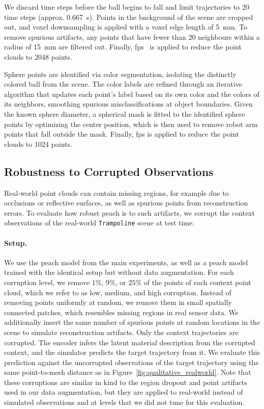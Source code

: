 We discard time steps before the ball begins to fall and limit trajectories to 20 time steps (approx. \SI{0.667}{\s}).
Points in the background of the scene are cropped out, and voxel downsampling is applied with a voxel edge length of \SI{5}{\mm}.
To remove spurious artifacts, any points that have fewer than $20$ neighbours within a radius of \SI{15}{\mm} are filtered out.
Finally, \gls{fps}~\citep{ruizhongtai2017pointnet} is applied to reduce the point clouds to 2048 points.

Sphere points are identified via color segmentation, isolating the distinctly colored ball from the scene.
The color labels are refined through an iterative algorithm that updates each point's label based on its own color and the colors of its neighbors, smoothing spurious misclassifications at object boundaries.
Given the known sphere diameter, a spherical mask is fitted to the identified sphere points by optimizing the center position, which is then used to remove robot arm points that fall outside the mask.
Finally, \gls{fps} is applied to reduce the point clouds to 1024 points.


\subsection{Robustness to Corrupted Observations}
\label{app:corruption}

Real-world point clouds can contain missing regions, for example due to occlusions or reflective surfaces, as well as spurious points from reconstruction errors. To evaluate how robust \gls{peach} is to such artifacts, we corrupt the context observations of the real-world \texttt{Trampoline} scene at test time.

\paragraph{Setup.}
We use the \gls{peach} model from the main experiments, as well as a \gls{peach} model trained with the identical setup but without data augmentation. For each corruption level, we remove $1\%$, $9\%$, or $25\%$ of the points of each context point cloud, which we refer to as low, medium, and high corruption. Instead of removing points uniformly at random, we remove them in small spatially connected patches, which resembles missing regions in real sensor data. We additionally insert the same number of spurious points at random locations in the scene to simulate reconstruction artifacts. Only the context trajectories are corrupted. The encoder infers the latent material description from the corrupted context, and the simulator predicts the target trajectory from it. We evaluate this prediction against the uncorrupted observations of the target trajectory using the same point-to-mesh distance as in Figure~\ref{fig:qualitative_realworld}. Note that these corruptions are similar in kind to the region dropout and point artifacts used in our data augmentation, but they are applied to real-world instead of simulated observations and at levels that we did not tune for this evaluation.

